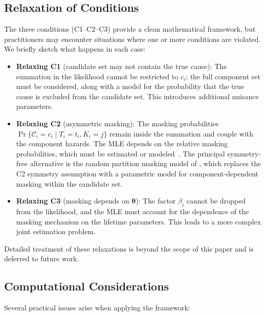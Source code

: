 \documentclass[11pt]{article}
\theoremstyle{definition}
\theoremstyle{plain}
\renewcommand{\v}[1]{\boldsymbol{#1}}
\newcommand{\btheta}{\v{\theta}}
\begin{document}
\subsection{Relaxation of Conditions}
\label{sec:relaxations}

The three conditions (C1--C2--C3) provide a clean mathematical framework,
but practitioners may encounter situations where one or more conditions
are violated.
We briefly sketch what happens in each case:

\begin{itemize}
    \item \textbf{Relaxing C1} (candidate set may not contain the true
    cause): The summation in the likelihood cannot be restricted to
    $c_i$; the full component set must be considered, along with a model
    for the probability that the true cause is excluded from the candidate
    set.
    This introduces additional nuisance parameters.

    \item \textbf{Relaxing C2} (asymmetric masking): The masking
    probabilities $\Pr\{\mathcal{C}_i = c_i \mid T_i = t_i, K_i = j\}$
    remain inside the summation and couple with the component hazards.
    The MLE depends on the relative masking probabilities, which must
    be estimated or modeled~\citep[see][for inference under dependent
    masking]{craiu2006}.
    The principal symmetry-free alternative is the random partition
    masking model of \citet{yu2012}, which replaces the C2 symmetry
    assumption with a parametric model for component-dependent masking
    within the candidate set.

    \item \textbf{Relaxing C3} (masking depends on $\btheta$): The
    factor $\beta_i$ cannot be dropped from the likelihood, and the MLE
    must account for the dependence of the masking mechanism on the
    lifetime parameters.
    This leads to a more complex joint estimation problem.
\end{itemize}

Detailed treatment of these relaxations is beyond the scope of this
paper and is deferred to future work.

\subsection{Computational Considerations}
\label{sec:computational}

Several practical issues arise when applying the framework:
\end{document}
